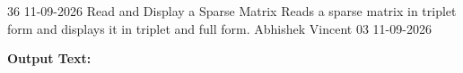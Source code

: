 \clearpage
\label{prog:36}
\programhead
  {36}
  {11-09-2026}
  {Read and Display a Sparse Matrix}
  {Reads a sparse matrix in triplet form and displays it in triplet and full form.}
  {Abhishek Vincent}
  {03}
  {11-09-2026}

\divider
\textbf{Output Text:}\par
\vspace{2pt}

